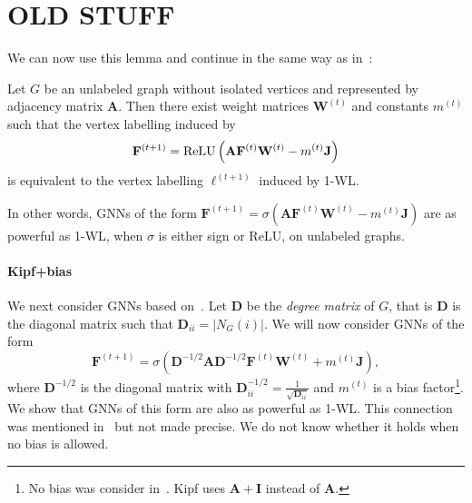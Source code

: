 \section{OLD STUFF}

We can now use this lemma and continue in the same way as in~\cite{grohewl}:
\begin{theorem}\label{thm:relu}
Let $G$ be an unlabeled graph without isolated vertices and represented by adjacency matrix $\mathbf{A}$. Then there exist weight matrices $\mathbf{W}^{(t)}$
and constants $m^{(t)}$ such that the vertex labelling induced by 
\begin{equation}
  \mathbf{F}^{(t+1)} = \text{\normalfont ReLU}\left(
    \mathbf{A}\mathbf{F}^{(t)}\mathbf{W}^{(t)} - m^{(t)}\mathbf{J}  \right)
\end{equation}
is equivalent to the vertex labelling $\ell^{(t+1)}$ induced by 1-WL.
\end{theorem}
In other words, GNNs of the form   $\mathbf{F}^{(t+1)} = \sigma\left(
    \mathbf{A}\mathbf{F}^{(t)}\mathbf{W}^{(t)} - m^{(t)}\mathbf{J}  \right)$
are as powerful as 1-WL, when $\sigma$ is either sign or ReLU, on unlabeled graphs.

\paragraph{Kipf+bias}
We next consider GNNs based on~\cite{kipf-loose}. Let $\mathbf{D}$ be the \emph{degree matrix} of $G$, that is $\mathbf{D}$
is the diagonal matrix such that
$    \mathbf{D}_{ii} = |N_G(i)|$. We will now consider GNNs of the form
\begin{equation}\label{GNN:Kipf}
    \mathbf{F}^{(t+1)} = \sigma\left(
        \mathbf{D}^{-1/2}\mathbf{A}\mathbf{D}^{-1/2}
        \mathbf{F}^{(t)}\mathbf{W}^{(t)} + m^{(t)}\mathbf{J}
    \right),
\end{equation}
where $\mathbf{D}^{-1/2}$
is the diagonal matrix with
$\mathbf{D}^{-1/2}_{ii} =
\frac{1}{\sqrt{\mathbf{D}_{ii}}}$ and $m^{(t)}$ is a bias factor\footnote{No bias was consider in~\cite{kipf-loose}. Kipf uses $\mathbf{A}+\mathbf{I}$ instead of $\mathbf{A}$.}.
We show that GNNs of this form are also as powerful as 1-WL. This connection was mentioned in~\cite{kipf-loose} but not made precise. We do not know whether it holds when no bias is allowed.

